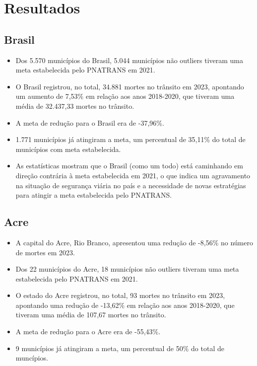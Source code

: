 \documentclass[
  letterpaper,
  DIV=11,
  numbers=noendperiod]{scrreprt}
\begin{document}

\chapter{Resultados}\label{resultados}

\section{Brasil}\label{brasil}

\begin{itemize}
\item
  Dos 5.570 municípios do Brasil, 5.044 municípios não outliers tiveram
  uma meta estabelecida pelo PNATRANS em 2021.
\item
  O Brasil registrou, no total, 34.881 mortes no trânsito em 2023,
  apontando um aumento de 7,53\% em relação aos anos 2018-2020, que
  tiveram uma média de 32.437,33 mortes no trânsito.
\item
  A meta de redução para o Brasil era de -37,96\%.
\item
  1.771 municípios já atingiram a meta, um percentual de 35,11\% do
  total de municípios com meta estabelecida.
\item
  As estatísticas mostram que o Brasil (como um todo) está caminhando em
  direção contrária à meta estabelecida em 2021, o que indica um
  agravamento na situação de segurança viária no país e a necessidade de
  novas estratégias para atingir a meta estabelecida pelo PNATRANS.
\end{itemize}

\section{Acre}\label{acre}

\begin{itemize}
\item
  A capital do Acre, Rio Branco, apresentou uma redução de -8,56\% no
  número de mortes em 2023.
\item
  Dos 22 municípios do Acre, 18 municípios não outliers tiveram uma meta
  estabelecida pelo PNATRANS em 2021.
\item
  O estado do Acre registrou, no total, 93 mortes no trânsito em 2023,
  apontando uma redução de -13,62\% em relação aos anos 2018-2020, que
  tiveram uma média de 107,67 mortes no trânsito.
\item
  A meta de redução para o Acre era de -55,43\%.
\item
  9 municípios já atingiram a meta, um percentual de 50\% do total de
  muncípios.
\end{itemize}
\end{document}
